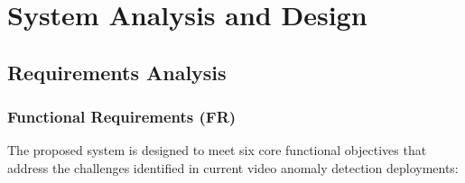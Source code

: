 \documentclass[12pt]{article}
\begin{document}
\clearpage
\section{System Analysis and Design}

\subsection{Requirements Analysis}

\subsubsection{Functional Requirements (FR)}
The proposed system is designed to meet six core functional objectives that address the challenges identified in current video anomaly detection deployments:
\end{document}
